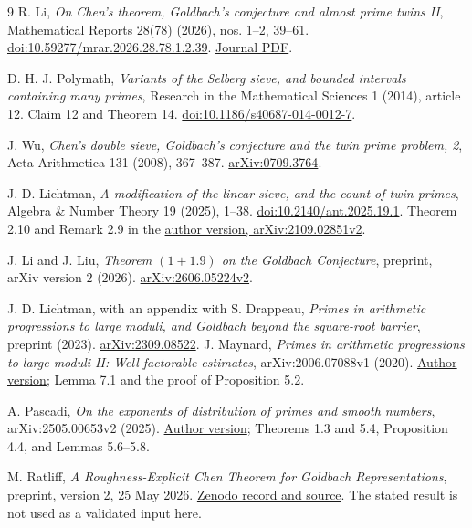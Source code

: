 \documentclass[11pt]{article}
\begin{document}
\begin{thebibliography}{9}
R. Li, \emph{On Chen's theorem, Goldbach's conjecture and almost prime
twins II}, Mathematical Reports 28(78) (2026), nos. 1--2, 39--61.
\href{https://doi.org/10.59277/mrar.2026.28.78.1.2.39}{doi:10.59277/mrar.2026.28.78.1.2.39}.
\href{https://imar.ro/journals/Mathematical_Reports/Pdfs/2026/1_2/3.pdf}{Journal PDF}.

D. H. J. Polymath, \emph{Variants of the Selberg sieve, and bounded
intervals containing many primes}, Research in the Mathematical Sciences
1 (2014), article 12. Claim 12 and Theorem 14.
\href{https://doi.org/10.1186/s40687-014-0012-7}{doi:10.1186/s40687-014-0012-7}.

J. Wu, \emph{Chen's double sieve, Goldbach's conjecture and the twin
prime problem, 2}, Acta Arithmetica 131 (2008), 367--387.
\href{https://arxiv.org/abs/0709.3764}{arXiv:0709.3764}.

J. D. Lichtman, \emph{A modification of the linear sieve, and the count
of twin primes}, Algebra \& Number Theory 19 (2025), 1--38.
\href{https://doi.org/10.2140/ant.2025.19.1}{doi:10.2140/ant.2025.19.1}.
Theorem 2.10 and Remark 2.9 in the
\href{https://arxiv.org/abs/2109.02851v2}{author version, arXiv:2109.02851v2}.

J. Li and J. Liu, \emph{Theorem $(1+1.9)$ on the Goldbach Conjecture},
preprint, arXiv version 2 (2026).
\href{https://arxiv.org/abs/2606.05224v2}{arXiv:2606.05224v2}.

J. D. Lichtman, with an appendix with S. Drappeau,
\emph{Primes in arithmetic progressions to large moduli, and Goldbach
beyond the square-root barrier}, preprint (2023).
\href{https://arxiv.org/abs/2309.08522}{arXiv:2309.08522}.
J. Maynard, \emph{Primes in arithmetic progressions to large moduli II:
Well-factorable estimates}, arXiv:2006.07088v1 (2020).
\href{https://arxiv.org/pdf/2006.07088v1}{Author version};
Lemma 7.1 and the proof of Proposition 5.2.

A. Pascadi, \emph{On the exponents of distribution of primes and smooth
numbers}, arXiv:2505.00653v2 (2025).
\href{https://arxiv.org/html/2505.00653v2}{Author version};
Theorems 1.3 and 5.4, Proposition 4.4, and Lemmas 5.6--5.8.


M. Ratliff, \emph{A Roughness-Explicit Chen Theorem for Goldbach
Representations}, preprint, version 2, 25 May 2026.
\href{https://zenodo.org/records/20377091}{Zenodo record and source}.
The stated result is not used as a validated input here.

\end{thebibliography}
\end{document}
